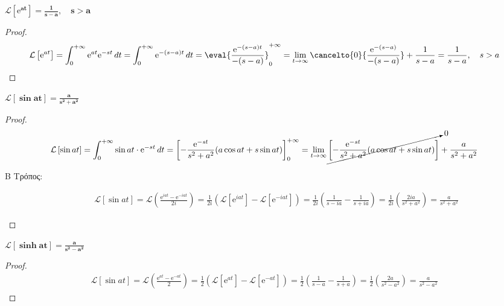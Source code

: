 \begin{example}
  $ \boldsymbol{\mathcal{L}\left[\mathrm{e}^{at}\right] = \frac{1}{s-a}, \quad s > a} $ 
\end{example}
\begin{proof}
  \[
    \mathcal{L}\left[\mathrm{e}^{at}\right] = \int_{0}^{+\infty} \mathrm{e}^{at} 
    \mathrm{e}^{-st} \,{dt} = \int_{0}^{+\infty} \mathrm{e}^{-(s-a)t} \,{dt} =
    \eval{\frac{\mathrm{e}^{-(s-a)t}}{-(s-a)}} _{0}^{+\infty} = 
    \lim_{t \to \infty} \cancelto{0}{\frac{\mathrm{e}^{-(s-a)}}{-(s-a)}}
    + \frac{1}{s-a} = \frac{1}{s-a}, \quad s > a
  \]
\end{proof}

\begin{example}
  $ \boldsymbol{\mathcal{L}\left[\sin{at}\right] = \frac{a}{s^{2}+a^{2}}} $
\end{example}
\begin{proof}
  \begin{align*}
    \mathcal{L}\left[\sin{at}\right] &= \int_{0}^{+\infty} \sin{at} \cdot
    \mathrm{e}^{-st} \,{dt} = {\left[- \frac{\mathrm{e}^{-st}}{s^{2}+a^{2}} 
    (a \cos{at} + s \sin{at})\right]} _{0}^{+\infty} = \lim_{t \to \infty} 
    \cancelto{0}{\left[- \frac{\mathrm{e}^{-st}}{s^{2}+a^{2}} (a \cos{at} + s
    \sin{at})\right]} + \frac{a}{s^{2}+a^{2}} \\
  \end{align*} 
  \begin{description}
    \item [Β Τρόπος:]
      \begin{align*}
        \mathcal{L}\left[\sin{at}\right] = \mathcal{L}\left(\frac{\mathrm{e}^{iat} -
        \mathrm{e}^{-iat}}{2i}\right) = \frac{1}{2i} 
        \left(\mathcal{L}[\mathrm{e}^{iat}] - \mathcal{L}[\mathrm{e}^{-iat}]\right) = 
        \frac{1}{2i} \left(\frac{1}{s-ia} - \frac{1}{s+ia}\right) = 
        \frac{1}{2i} \left(\frac{2ia}{s^{2}+a^{2}}\right) = \frac{a}{s^{2}+a^{2}}
      \end{align*}
  \end{description}
\end{proof}

\begin{example}
  $ \boldsymbol{\mathcal{L}\left[\sinh{at}\right] = \frac{a}{s^{2}-a^{2}}} $
\end{example}
\begin{proof}
  \begin{align*}
    \mathcal{L}\left[\sin{at}\right] = \mathcal{L}\left(\frac{\mathrm{e}^{at} -
    \mathrm{e}^{-at}}{2}\right) = \frac{1}{2} 
    \left(\mathcal{L}[\mathrm{e}^{at}] - \mathcal{L}[\mathrm{e}^{-at}]\right) = 
    \frac{1}{2} \left(\frac{1}{s-a} - \frac{1}{s+a}\right) = 
    \frac{1}{2} \left(\frac{2a}{s^{2}-a^{2}}\right) = \frac{a}{s^{2}-a^{2}}
  \end{align*}
\end{proof}

